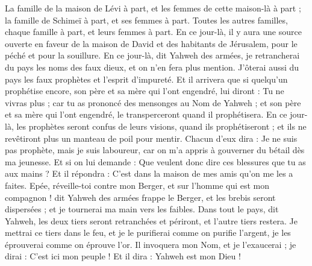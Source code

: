 \begin{multicols}{2}
La famille de la maison de Lévi à part, et les femmes de cette maison-là à part ; la famille de Schimeï à part, et ses femmes à part.
Toutes les autres  familles, chaque famille à part, et leurs femmes à part.
\VerseOne{}En ce jour-là, il y aura une source ouverte en faveur de la maison de David et des habitants de Jérusalem, pour le péché et pour la souillure.
En ce jour-là, dit Yahweh des armées, je retrancherai du pays les noms des faux dieux, et on n'en fera plus mention. J'ôterai aussi du pays les faux prophètes et l'esprit d'impureté.
Et il arrivera que si quelqu'un prophétise encore, son père et sa mère qui l’ont engendré, lui diront : Tu ne vivras plus ; car tu as prononcé des mensonges au Nom de Yahweh ; et son père et sa mère qui l’ont engendré, le transperceront quand il prophétisera.
En ce jour-là, les prophètes seront confus de leurs visions, quand ils prophétiseront ; et ils ne revêtiront plus un manteau de poil pour mentir.
Chacun d’eux dira : Je ne suis pas prophète, mais je suis laboureur, car on m'a appris à gouverner du bétail dès ma jeunesse.
Et si on lui demande : Que veulent donc dire ces blessures que tu as aux mains ? Et il répondra : C’est dans la maison de mes amis qu’on me les a faites.
Epée, réveille-toi contre mon Berger, et sur l'homme qui est mon compagnon ! dit Yahweh des armées frappe le Berger, et les brebis seront dispersées ; et je tournerai ma main vers les faibles.
Dans tout le pays, dit Yahweh, les deux tiers seront retranchées et périront, et l’autre tiers restera.
Je mettrai ce tiers dans le feu, et je le purifierai comme on purifie l'argent, je les éprouverai comme on éprouve l'or. Il invoquera mon Nom, et je l'exaucerai ; je dirai : C'est ici mon peuple ! Et il dira : Yahweh est mon Dieu !

\end{multicols}
